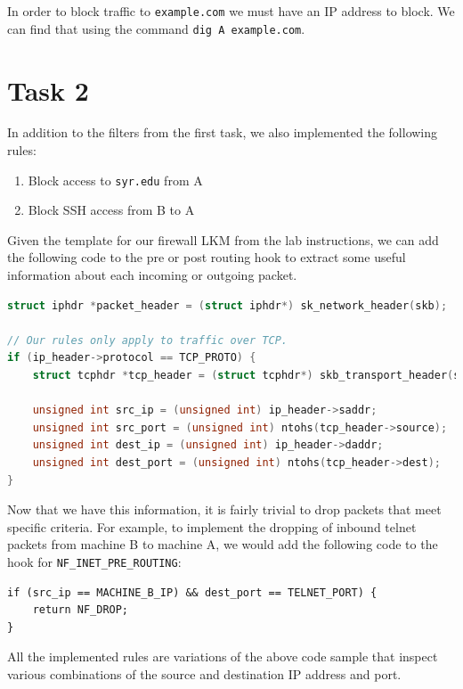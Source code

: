 \documentclass[12pt,letterpaper]{article}
\begin{document}
		In order to block traffic to \texttt{example.com} we must have an IP address to block. We can find that using the command \texttt{dig A example.com}.
	
	\section*{Task 2}
		In addition to the filters from the first task, we also implemented the following rules:
		
		\begin{enumerate}
			\item Block access to \texttt{syr.edu} from A
			\item Block SSH access from B to A
		\end{enumerate}
	
		Given the template for our firewall LKM from the lab instructions, we can add the following code to the pre or post routing hook to extract some useful information about each incoming or outgoing packet.
	
		\begin{lstlisting}[caption={Extracting info from packets.}, language=c]
struct iphdr *packet_header = (struct iphdr*) sk_network_header(skb);

// Our rules only apply to traffic over TCP.
if (ip_header->protocol == TCP_PROTO) {
	struct tcphdr *tcp_header = (struct tcphdr*) skb_transport_header(skb);
	
	unsigned int src_ip = (unsigned int) ip_header->saddr;
	unsigned int src_port = (unsigned int) ntohs(tcp_header->source);
	unsigned int dest_ip = (unsigned int) ip_header->daddr;
	unsigned int dest_port = (unsigned int) ntohs(tcp_header->dest);
}
		\end{lstlisting}
		
		Now that we have this information, it is fairly trivial to drop packets that meet specific criteria. For example, to implement the dropping of inbound telnet packets from machine B to machine A, we would add the following code to the hook for \texttt{NF\_INET\_PRE\_ROUTING}:
		
		\begin{lstlisting}[caption={Blocking telnet traffic from machine B to machine A}]
if (src_ip == MACHINE_B_IP) && dest_port == TELNET_PORT) {
	return NF_DROP;
}
		\end{lstlisting}
		
		All the implemented rules are variations of the above code sample that inspect various combinations of the source and destination IP address and port.
		
\end{document}
